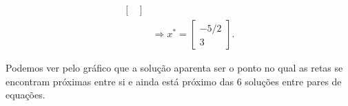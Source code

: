 \begin{questions}
\begin{solution}
\begin{align*}
\begin{bmatrix}
        \end{bmatrix}\\
        &\Rightarrow
        \boxed{
        x^* = 
        \begin{bmatrix}
            -5/2\\ 3
        \end{bmatrix}
        }.
    \end{align*}
    \begin{center}
    \end{center}
    Podemos ver pelo gráfico que a solução aparenta ser o ponto no qual as retas se encontram próximas entre si e ainda está próximo das 6 soluções entre pares de equações.
\end{solution}


\end{questions}
